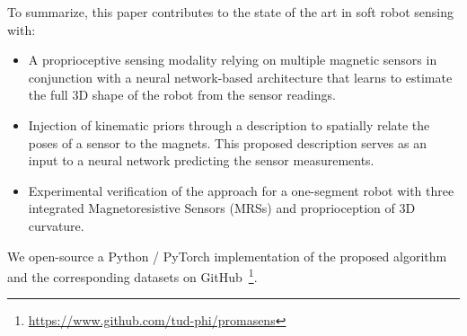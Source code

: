 To summarize, this paper contributes to the state of the art in soft robot sensing with:
%
\begin{itemize}
    \item A proprioceptive sensing modality relying on multiple magnetic sensors in conjunction with a neural network-based architecture that learns to estimate the full 3D shape of the robot from the sensor readings. %
    \item Injection of kinematic priors through a description to spatially relate the poses of a sensor to the magnets. This proposed description serves as an input to a neural network predicting the sensor measurements. %
    \item Experimental verification of the approach for a one-segment robot with three integrated Magnetoresistive Sensors (MRSs) and proprioception of 3D curvature.    %
\end{itemize}
We open-source a Python / PyTorch implementation of the proposed algorithm and the corresponding datasets on GitHub~\footnote{\url{https://www.github.com/tud-phi/promasens}}.
